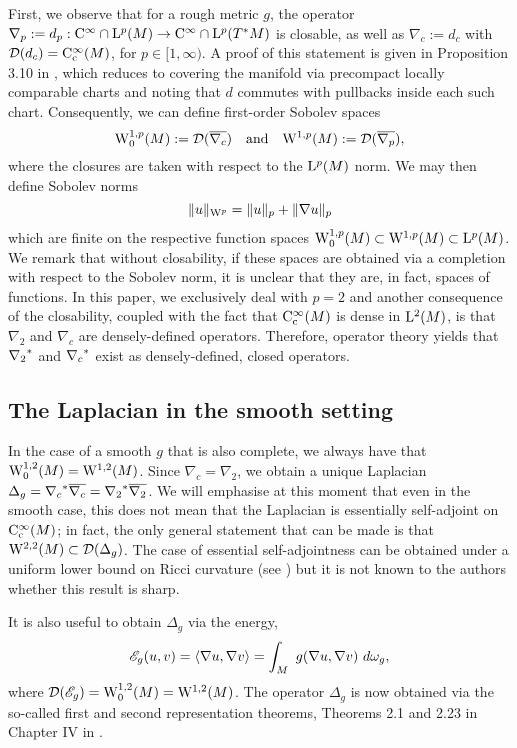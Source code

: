 \documentclass[a4paper, 12pt]{amsart}
\begin{document}
First, we observe that for a rough metric $g$, the operator
$\nabla_p := d_p: \Ck{\infty} \cap \Lp{p}(M) \to \Ck{\infty} \cap \Lp{p}(T^\ast M)$
is closable, as well as $\nabla_c := d_c$ with $\dom(d_c) = \Ck[c]{\infty}(M)$,
for $p \in [1, \infty)$. A proof of this statement is given in Proposition 3.10 in \cite{BRough}, 
which reduces to covering the manifold via precompact locally comparable
charts and noting that $d$ commutes with pullbacks inside each such chart.
Consequently, we can define first-order Sobolev spaces
\[
\Sob[0]{1,p}(M) := \dom(\overline{\nabla_c})\quad \text{and}\quad  \Sob{1,p}(M) := \dom(\overline{\nabla_p}),
\]
where the closures are taken with respect to the \(\Lp{p}(M)\) norm. We may then define Sobolev norms
\[
\|u\|_{\Sob{p}} = \|u\|_p + \|\nabla u\|_p
\]
which are finite on the respective function spaces $\Sob[0]{1,p}(M) \subset \Sob{1,p}(M) \subset \Lp{p}(M)$. We remark that without closability, if these spaces are obtained via a completion with respect to the Sobolev norm, it is unclear that they are, in fact, spaces of functions. In this paper, we exclusively deal with \(p = 2\) and another consequence of the closability, coupled with the 
fact that $\Ck[c]{\infty}(M)$ is dense in $\Lp{2}(M)$,
is that $\nabla_2$ and $\nabla_c$ are densely-defined
operators. Therefore, operator theory yields 
that $\adj{\nabla_2}$ and $\adj{\nabla_c}$ exist
as densely-defined, closed operators.

\subsection{The Laplacian in the smooth setting}

In the case of a smooth $g$ that is also complete, we
always have that $\SobH[0]{1}(M) = \SobH{1}(M)$. 
Since $\nabla_c = \nabla_2$, we obtain 
a unique Laplacian $\Delta_g = \adj{\nabla_c} \close{\nabla_c} = \adj{\nabla_2}\close{\nabla_2}$.
We will emphasise at this moment that even in the smooth case, this does not mean that the Laplacian is essentially self-adjoint on $\Ck[c]{\infty}(M)$; in fact, the only general statement that can be made is that
$\SobH{2}(M) \subset \dom(\Delta_g)$. The 
case of essential self-adjointness can
be obtained under a uniform lower bound on Ricci
curvature (see \cite{BDensity}) but it
is not known to the authors whether this result is sharp.

It is also useful to obtain $\Delta_g$ via the energy,
$$\sE_g(u,v) = \inprod{\nabla u, \nabla v} = \int_M\ g(\nabla u, \nabla v)\ d\omega_g,$$
where $\dom(\sE_g) = \SobH[0]{1}(M) = \SobH{1}(M)$.
The operator $\Delta_g$ is now obtained via the so-called first and second representation 
theorems, Theorems 2.1 and 2.23 in Chapter IV  in \cite{Kato}.
 
\end{document}
